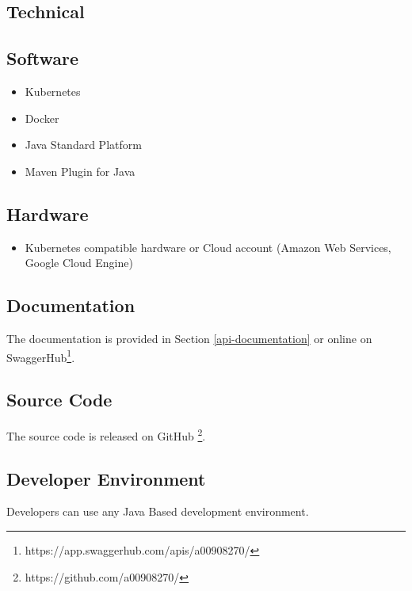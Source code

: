 \subsection{Technical}\label{technical}

\subsection{Software}\label{software}

\begin{itemize}
\tightlist
\item
  Kubernetes
\item
  Docker
\item
  Java Standard Platform
\item
  Maven Plugin for Java
\end{itemize}

\subsection{Hardware}\label{hardware}

\begin{itemize}
\tightlist
\item
  Kubernetes compatible hardware or Cloud account (Amazon Web Services,
  Google Cloud Engine)
\end{itemize}

\subsection{Documentation}\label{documentation}

The documentation is provided in Section \ref{api-documentation} or
online on SwaggerHub\footnote{https://app.swaggerhub.com/apis/a00908270/}.

\subsection{Source Code}\label{source-code}

The source code is released on GitHub \footnote{https://github.com/a00908270/}.

\subsection{Developer Environment}\label{developer-environment}

Developers can use any Java Based development environment.

